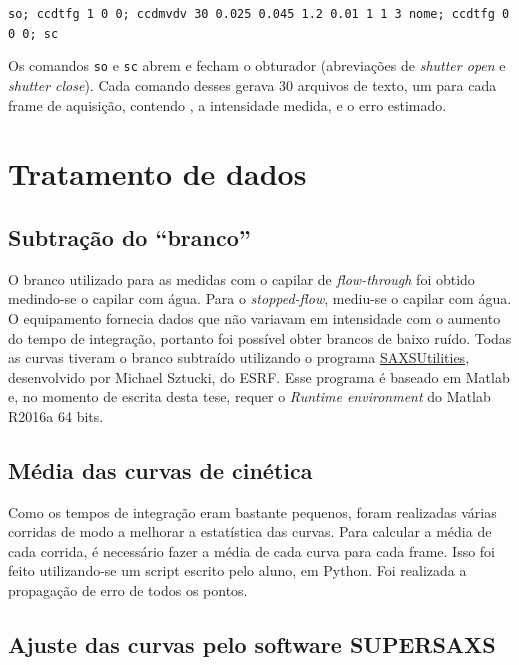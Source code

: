 			\begin{center}
				\begin{footnotesize}
					\texttt{so; ccdtfg 1 0 0; ccdmvdv 30 0.025 0.045 1.2 0.01 1 1 3 nome; ccdtfg 0 0 0; sc}
				\end{footnotesize}
			\end{center}
	
			Os comandos \texttt{so} e \texttt{sc} abrem e fecham o obturador (abreviações de \emph{shutter open} e \emph{shutter close}). Cada comando desses gerava 30 arquivos de texto, um para cada frame de aquisição, contendo \q{}, a intensidade medida, e o erro estimado.


		\section{Tratamento de dados}  
			\subsection{Subtração do ``branco''}
			
			O branco utilizado para as medidas com o capilar de \emph{flow-through} foi obtido medindo-se o capilar com água. Para o \emph{stopped-flow}, mediu-se o capilar com água. O equipamento fornecia dados que não variavam em intensidade com o aumento do tempo de integração, portanto foi possível obter brancos de baixo ruído. Todas as curvas tiveram o branco subtraído utilizando o programa \href{http://www.sztucki.de/SAXSutilities/}{SAXSUtilities}, desenvolvido por Michael Sztucki, do ESRF. Esse programa é baseado em Matlab e, no momento de escrita desta tese, requer o \emph{Runtime environment} do Matlab R2016a 64 bits.
			
			\subsection{Média das curvas de cinética}
			
			Como os tempos de integração eram bastante pequenos, foram realizadas várias corridas de modo a melhorar a estatística das curvas. Para calcular a média de cada corrida, é necessário fazer a média de cada curva para cada frame. Isso foi feito utilizando-se um script escrito pelo aluno, em Python. Foi realizada a propagação de erro de todos os pontos. 
			
			\subsection{Ajuste das curvas pelo software SUPERSAXS}
			
